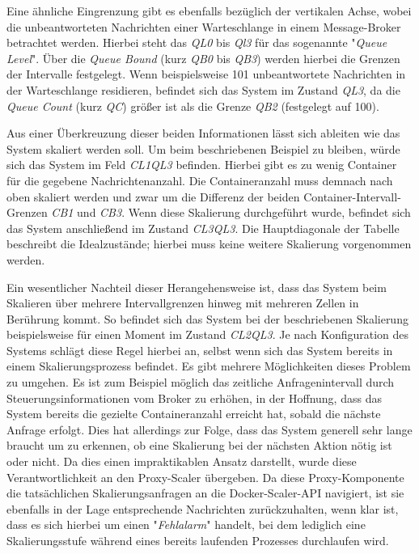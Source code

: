 Eine ähnliche Eingrenzung gibt es ebenfalls bezüglich der vertikalen Achse, wobei die unbeantworteten Nachrichten einer Warteschlange in einem Message-Broker betrachtet werden. Hierbei steht das \emph{QL0} bis \emph{Ql3} für das sogenannte "\emph{Queue Level}". Über die \emph{Queue Bound} (kurz \emph{QB0} bis \emph{QB3}) werden hierbei die Grenzen der Intervalle festgelegt. Wenn beispielsweise 101 unbeantwortete Nachrichten in der Warteschlange residieren, befindet sich das System im Zustand \emph{QL3}, da die \emph{Queue Count} (kurz \emph{QC}) größer ist als die Grenze \emph{QB2} (festgelegt auf 100).

Aus einer Überkreuzung dieser beiden Informationen lässt sich ableiten wie das System skaliert werden soll. Um beim beschriebenen Beispiel zu bleiben, würde sich das System im Feld \emph{CL1QL3} befinden. Hierbei gibt es zu wenig Container für die gegebene Nachrichtenanzahl. Die Containeranzahl muss demnach nach oben skaliert werden und zwar um die Differenz der beiden Container-Intervall-Grenzen \emph{CB1} und \emph{CB3}. Wenn diese Skalierung durchgeführt wurde, befindet sich das System anschließend im Zustand \emph{CL3QL3}. Die Hauptdiagonale der Tabelle beschreibt die Idealzustände; hierbei muss keine weitere Skalierung vorgenommen werden. 

\label{prometheus:skalierungsmechanismus}
Ein wesentlicher Nachteil dieser Herangehensweise ist, dass das System beim Skalieren über mehrere Intervallgrenzen hinweg mit mehreren Zellen in Berührung kommt. So befindet sich das System bei der beschriebenen Skalierung beispielsweise für einen Moment im Zustand \emph{CL2QL3}. Je nach Konfiguration des Systems schlägt diese Regel hierbei an, selbst wenn sich das System bereits in einem Skalierungsprozess befindet. Es gibt mehrere Möglichkeiten dieses Problem zu umgehen. Es ist zum Beispiel möglich das zeitliche Anfragenintervall durch Steuerungsinformationen vom Broker zu erhöhen, in der Hoffnung, dass das System bereits die gezielte Containeranzahl erreicht hat, sobald die nächste Anfrage erfolgt. Dies hat allerdings zur Folge, dass das System generell sehr lange braucht um zu erkennen, ob eine Skalierung bei der nächsten Aktion nötig ist oder nicht. Da dies einen impraktikablen Ansatz darstellt, wurde diese Verantwortlichkeit an den Proxy-Scaler übergeben. Da diese Proxy-Komponente die tatsächlichen Skalierungsanfragen an die Docker-Scaler-API navigiert, ist sie ebenfalls in der Lage entsprechende Nachrichten zurückzuhalten, wenn klar ist, dass es sich hierbei um einen "\emph{Fehlalarm}" handelt, bei dem lediglich eine Skalierungsstufe während eines bereits laufenden Prozesses durchlaufen wird. 

